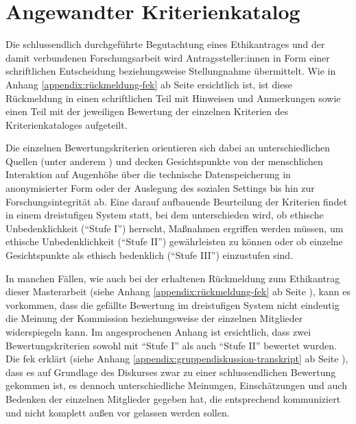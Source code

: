 \documentclass[a4paper,12pt,twoside]{scrreprt}
\begin{document}
\section{Angewandter Kriterienkatalog}
\label{sec:angewandter-kriterienkatalog}

Die schlussendlich durchgeführte Begutachtung eines Ethikantrages und der damit verbundenen Forschungsarbeit wird Antragssteller:innen in Form einer schriftlichen Entscheidung beziehungsweise Stellungnahme übermittelt. \cite[4]{forschungsethik-kommission_der_fachhochschule_vorarlberg_verfahrensordnung_2020} Wie in Anhang \ref{appendix:rückmeldung-fek} ab Seite \pageref{appendix:rückmeldung-fek} ersichtlich ist, ist diese Rückmeldung in einen schriftlichen Teil mit Hinweisen und Anmerkungen sowie einen Teil mit der jeweiligen Bewertung der einzelnen Kriterien des Kriterienkataloges aufgeteilt.

Die einzelnen Bewertungskriterien orientieren sich dabei an unterschiedlichen Quellen (unter anderem \cite{manzeschke_meestar_2015, marckmann_was_2000, schuchter_care_2018}) und decken Gesichtspunkte von der menschlichen Interaktion auf Augenhöhe über die technische Datenspeicherung in anonymisierter Form oder der Auslegung des sozialen Settings bis hin zur Forschungsintegrität ab. Eine darauf aufbauende Beurteilung der Kriterien findet in einem dreistufigen System statt, bei dem unterschieden wird, ob ethische Unbedenklichkeit (\enquote{Stufe I}) herrscht, Maßnahmen ergriffen werden müssen, um ethische Unbedenklichkeit (\enquote{Stufe II}) gewährleisten zu können oder ob einzelne Gesichtspunkte als ethisch bedenklich (\enquote{Stufe III}) einzustufen sind. \cite[1]{forschungsethik-kommission_der_fachhochschule_vorarlberg_kriterienkatalog_2021}

\medskip

In manchen Fällen, wie auch bei der erhaltenen Rückmeldung zum Ethikantrag dieser Masterarbeit (siehe Anhang \ref{appendix:rückmeldung-fek} ab Seite \pageref{appendix:rückmeldung-fek}), kann es vorkommen, dass die gefällte Bewertung im dreistufigen System nicht eindeutig die Meinung der Kommission beziehungsweise der einzelnen Mitglieder widerspiegeln kann. Im angesprochenen Anhang ist ersichtlich, dass zwei Bewertungskriterien sowohl mit \enquote{Stufe I} als auch \enquote{Stufe II} bewertet wurden. Die \ac{fek} erklärt (siehe Anhang \ref{appendix:gruppendiskussion-transkript} ab Seite \pageref{appendix:gruppendiskussion-transkript}), dass es auf Grundlage des Diskurses zwar zu einer schlussendlichen Bewertung gekommen ist, es dennoch unterschiedliche Meinungen, Einschätzungen und auch Bedenken der einzelnen Mitglieder gegeben hat, die entsprechend kommuniziert und nicht komplett außen vor gelassen werden sollen.
\end{document}
